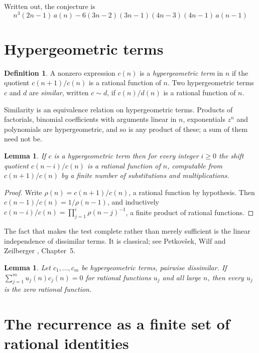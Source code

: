 \documentclass[11pt,a4paper]{article}
\theoremstyle{plain}
\newtheorem{lemma}[theorem]{Lemma}
\theoremstyle{definition}
\newtheorem{definition}[theorem]{Definition}
\begin{document}
Written out, the conjecture is
\begin{equation}\label{eq:conj}
n^{3} \left(2 n - 1\right)\,a(n) -  6 \left(3 n - 2\right) \left(3 n - 1\right) \left(4 n - 3\right) \left(4 n - 1\right)\,a(n-1)
\end{equation}

\section{Hypergeometric terms}

\begin{definition}
A nonzero expression $c(n)$ is a \emph{hypergeometric term} in $n$ if the quotient
$c(n+1)/c(n)$ is a rational function of $n$. Two hypergeometric terms $c$ and $d$ are
\emph{similar}, written $c\sim d$, if $c(n)/d(n)$ is a rational function of $n$.
\end{definition}

Similarity is an equivalence relation on hypergeometric terms. Products of factorials,
binomial coefficients with arguments linear in $n$, exponentials $z^{n}$ and polynomials
are hypergeometric, and so is any product of these; a sum of them need not be.

\begin{lemma}\label{lem:shift}
If $c$ is a hypergeometric term then for every integer $i\ge 0$ the shift quotient
$c(n-i)/c(n)$ is a rational function of $n$, computable from $c(n+1)/c(n)$ by a finite
number of substitutions and multiplications.
\end{lemma}

\begin{proof}
Write $\rho(n)=c(n+1)/c(n)$, a rational function by hypothesis. Then
$c(n-1)/c(n)=1/\rho(n-1)$, and inductively
$c(n-i)/c(n)=\prod_{j=1}^{i}\rho(n-j)^{-1}$, a finite product of rational functions.
\end{proof}

The fact that makes the test complete rather than merely sufficient is the linear
independence of dissimilar terms. It is classical; see Petkov\v{s}ek, Wilf and Zeilberger
\cite{AB}, Chapter~5.

\begin{lemma}\label{lem:indep}
Let $c_{1},\dots,c_{m}$ be hypergeometric terms, pairwise dissimilar. If
$\sum_{j=1}^{m}u_{j}(n)c_{j}(n)=0$ for rational functions $u_{j}$ and all large $n$, then
every $u_{j}$ is the zero rational function.
\end{lemma}

\section{The recurrence as a finite set of rational identities}
\end{document}
